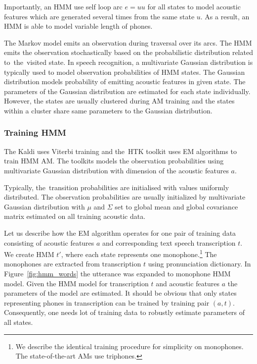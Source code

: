 Importantly, an \ac{HMM} use self loop arc $e=uu$ for all states to model acoustic features which are generated several times from the same state $u$.
As a result, an \ac{HMM} is able to model variable length of phones.


The Markov model emits an observation during traversal over its arcs.
The \acl{HMM} emits the observation stochastically based on the probabilistic distribution related to~the~visited state.
In speech recognition, a multivariate Gaussian distribution is typically used to model observation probabilities of \ac{HMM} states.
The Gaussian distribution models probability of emitting acoustic features in given state.
The parameters of the Gaussian distribution are estimated for each state individually.
However, the states are usually clustered during \ac{AM} training and the states within a cluster share same parameters to the Gaussian distribution.


\subsubsection*{Training \ac{HMM}}
\label{sub:trainhmm}

The Kaldi uses Viterbi training and the~\ac{HTK} toolkit uses \acl{EM} algorithms to train \ac{HMM} \acl{AM}.
The toolkits models the observation probabilities using multivariate Gaussian distribution with dimension of the acoustic features $a$.

Typically, the~transition probabilities are initialised with values uniformly distributed.
The observation probabilities are usually initialized by multivariate Gaussian distribution with $\mu$ and $\Sigma$ set to global mean and global covariance matrix estimated on all training acoustic data.

Let us describe how the \ac{EM} algorithm operates for one pair of training data consisting of acoustic features $a$ and corresponding text speech transcription $t$.
We create \ac{HMM} $t'$, where each state represents one monophone.\footnote{We describe the identical training procedure for simplicity on monophones. The state-of-the-art \acp{AM} use triphones.} 
The monophones are extracted from transcription $t$ using pronunciation dictionary.
In Figure~\ref{fig:hmm_words} the utterance  was expanded to monophone \ac{HMM} model.
Given the \ac{HMM} model for transcription $t$ and acoustic features $a$ the parameters of the model are estimated.
It should be obvious that only states representing phones in transcription can be trained by training pair $(a, t)$.
Consequently, one needs lot of training data to robustly estimate parameters of all states.

